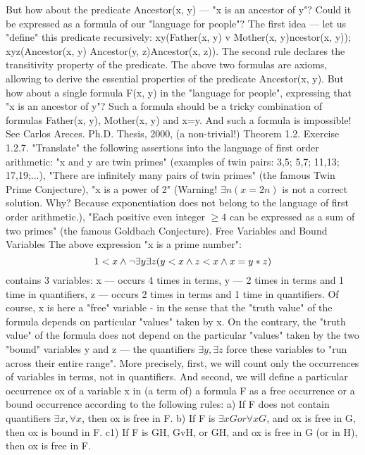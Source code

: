 But how about the predicate Ancestor(x, y) --- "x is an ancestor of y"? Could it be expressed as a formula
of our "language for people"? The first idea --- let us "define" this predicate recursively:
\forall x\forall y(Father(x, y) v Mother(x, y)\IMPLIES \forall ncestor(x, y));
\forall x\forall y\forall z(Ancestor(x, y) \AND  Ancestor(y, z)\IMPLIES Ancestor(x, z)).
The second rule declares the transitivity property of the predicate. The above two formulas are axioms,
allowing to derive the essential properties of the predicate Ancestor(x, y). But how about a single formula
F(x, y) in the "language for people", expressing that "x is an ancestor of y"? Such a formula should be a
tricky combination of formulas Father(x, y), Mother(x, y) and x=y. And such a formula is impossible! See
Carlos Areces. Ph.D. Thesis, 2000, (a non-trivial!) Theorem 1.2.
Exercise 1.2.7. "Translate" the following assertions into the language of first order arithmetic:
"x and y are twin primes" (examples of twin pairs: 3,5; 5,7; 11,13; 17,19;...),
"There are infinitely many pairs of twin primes" (the famous Twin Prime Conjecture),
"x is a power of 2" (Warning! \(\exists n(x=2n)\) is not a correct solution. Why? Because exponentiation does not
belong to the language of first order arithmetic.),
"Each positive even integer \(\geq4\) can be expressed as a sum of two primes"
(the famous Goldbach Conjecture).
Free Variables and Bound Variables
The above expression "x is a prime number":
\[1<x \wedge  \neg \exists y\exists z(y<x \wedge  z<x \wedge  x=y*z)\]
contains 3 variables: x --- occurs 4 times in terms, y --- 2 times in terms and 1 time in quantifiers, z --- occurs
2 times in terms and 1 time in quantifiers. Of course, x is here a "free" variable - in the sense that the
"truth value" of the formula depends on particular "values" taken by x. On the contrary, the "truth value"
of the formula does not depend on the particular "values" taken by the two "bound" variables y and z ---
the quantifiers \(\exists y, \exists z\) force these variables to "run across their entire range".
More precisely, first, we will count only the occurrences of variables in terms, not in quantifiers. And
second, we will define a particular occurrence ox of a variable x in (a term of) a formula F as a free
occurrence or a bound occurrence according to the following rules:
a) If F does not contain quantifiers \(\exists x, \forall x\), then ox is free in F.
b) If F is \(\exists xG or \forall xG\), and ox is free in G, then ox is bound in F.
c1) If F is G\AND H, GvH, or G\IMPLIES H, and ox is free in G (or in H), then ox is free in F.
